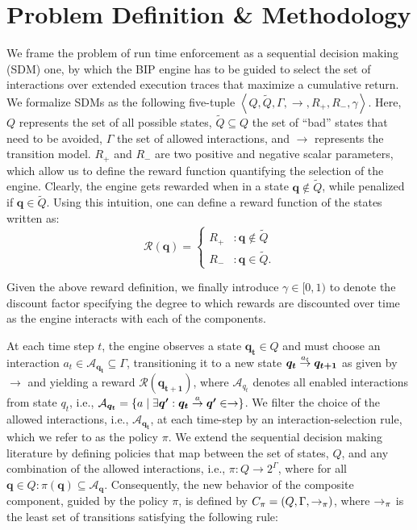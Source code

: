 \section{Problem Definition \& Methodology}
\label{sec:rerl}
We frame the problem of run time enforcement as a sequential decision making (SDM) one, by which the BIP engine has to be guided to select the set of interactions over extended execution traces that maximize a cumulative return.  We formalize SDMs as the following five-tuple $\left \langle Q, \tilde{Q},\Gamma, \rightarrow, {R}_{+}, {R}_{-}, \gamma \right\rangle$.  Here, $Q$ represents the set of all possible states, $\tilde{Q} \subseteq Q$ the set of ``bad'' states that need to be avoided, $\Gamma$ the set of allowed interactions, and $\rightarrow$ represents the transition model. $R_{+}$ and ${R}_{-}$ are two positive and negative scalar parameters, which allow us to define the reward function quantifying the selection of the engine.
Clearly, the engine gets rewarded when in a state $ \bm{q} \notin \tilde{Q}$, while penalized if $ \bm{q} \in \tilde{Q}$. Using this intuition, one can define a reward function of the states written as: 
%
\begin{displaymath}
   \mathcal{R}( \bm{q}) = \left\{
     \begin{array}{lr}
       R_{+} & :   \bm{q} \notin \tilde{Q} \\
       R_{-} & :  \bm{q} \in \tilde{Q}.
     \end{array}
   \right.
\end{displaymath} 

Given the above reward definition, we finally introduce $\gamma \in [0,1)$ to denote the discount factor specifying the degree to which rewards are discounted over time as the engine interacts with each of the components. 

At each time step $t$, the engine observes a state $ \bm{q_{t}} \in Q$ and must choose an interaction $a_{t} \in \mathcal{A}_{ \bm{q_t}} \subseteq \Gamma$, transitioning it to a new state $ \bm{q_{t}} \goesto[a_{t}] \bm{q_{t+1}}$ as given by $\rightarrow$ and yielding a reward $\mathcal{R}\left( \bm{q_{t+1}}\right)$, where $\mathcal{A}_{q_t}$ denotes all enabled interactions from state  $q_{t}$, i.e., $\mathcal{A}_{ \bm{q_t}} = \{a \mid \exists  \bm{q'}:  \bm{q_{t}} \goesto[a]  \bm{q'} \in \rightarrow\}$. 
We filter the choice of the allowed interactions, i.e., $\mathcal{A}_{ \bm{q_t}}$, at each time-step by an interaction-selection rule, which we refer to as the policy $\pi$. We extend the sequential decision making literature by defining policies that map between the set of states, $Q$, and any combination of the allowed interactions, i.e., $\pi: Q \rightarrow 2^{\Gamma}$, where for all $ \bm{q} \in Q: \pi( \bm{q}) \subseteq\mathcal{A}_{ \bm{q}}$.
Consequently, the new behavior of the composite component, guided by the policy $\pi$, is defined by $C_\pi = (Q, \Gamma, \goesto_\pi)$, where $\goesto_\pi$ is the least set of transitions satisfying the following rule:

